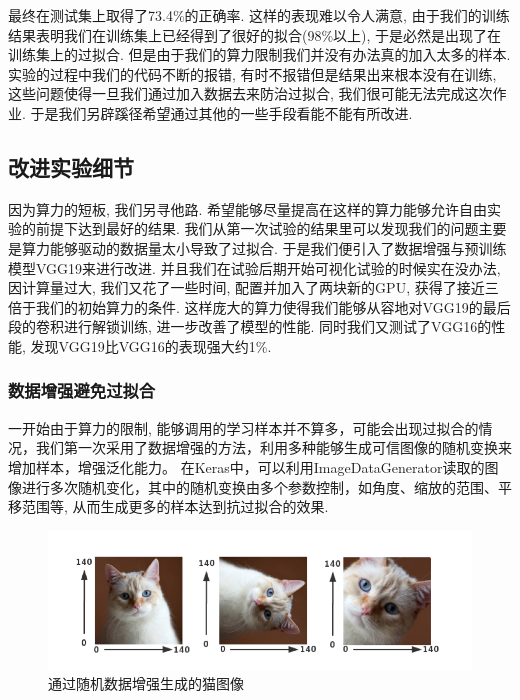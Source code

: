 \documentclass[lang=cn,11pt]{elegantpaper}
\begin{document}
最终在测试集上取得了73.4\%的正确率. 这样的表现难以令人满意, 由于我们的训练结果表明我们在训练集上已经得到了很好的拟合(98\%以上), 于是必然是出现了在训练集上的过拟合. 但是由于我们的算力限制我们并没有办法真的加入太多的样本. 实验的过程中我们的代码不断的报错, 有时不报错但是结果出来根本没有在训练, 这些问题使得一旦我们通过加入数据去来防治过拟合, 我们很可能无法完成这次作业. 于是我们另辟蹊径希望通过其他的一些手段看能不能有所改进.




\subsection{改进实验细节}

因为算力的短板, 我们另寻他路. 希望能够尽量提高在这样的算力能够允许自由实验的前提下达到最好的结果. 我们从第一次试验的结果里可以发现我们的问题主要是算力能够驱动的数据量太小导致了过拟合. 于是我们便引入了数据增强与预训练模型VGG19来进行改进. 并且我们在试验后期开始可视化试验的时候实在没办法, 因计算量过大, 我们又花了一些时间, 配置并加入了两块新的GPU, 获得了接近三倍于我们的初始算力的条件. 这样庞大的算力使得我们能够从容地对VGG19的最后段的卷积进行解锁训练, 进一步改善了模型的性能. 同时我们又测试了VGG16的性能, 发现VGG19比VGG16的表现强大约1\%. 



\subsubsection{数据增强避免过拟合}
一开始由于算力的限制, 能够调用的学习样本并不算多，可能会出现过拟合的情况，我们第一次采用了数据增强的方法，利用多种能够生成可信图像的随机变换来增加样本，增强泛化能力。 在Keras中，可以利用ImageDataGenerator读取的图像进行多次随机变化，其中的随机变换由多个参数控制，如角度、缩放的范围、平移范围等, 从而生成更多的样本达到抗过拟合的效果.

\begin{figure}[hbtp]
\centering
  \includegraphics{aug.png}
  \caption{通过随机数据增强生成的猫图像\label{fig:augcat}}
\end{figure}
\end{document}
